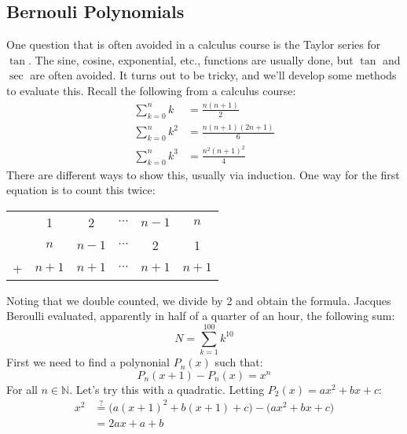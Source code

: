         \subsection{Bernouli Polynomials}
            One question that is often avoided in a calculus course
            is the Taylor series for $\tan$. The sine, cosine,
            exponential, etc., functions are usually done, but
            $\tan$ and $\sec$ are often avoided. It turns out to be
            tricky, and we'll develop some methods to evaluate this.
            Recall the following from a calculus course:
            \begin{align}
                \sum_{k=0}^{n}k&=\frac{n(n+1)}{2}\\
                \sum_{k=0}^{n}k^{2}&=
                \frac{n(n+1)(2n+1)}{6}\\
                \sum_{k=0}^{n}k^{3}&=\frac{n^{2}(n+1)^{2}}{4}
            \end{align}
            There are different ways to show this, usually via
            induction. One way for the first equation is to count
            this twice:
            \begin{table}[]
                \centering
                \begin{tabular}{cc|c|c|c|c}
                    &1&2&$\cdots$&$n-1$&$n$\\
                    &$n$&$n-1$&$\cdots$&2&1\\
                    \hline
                    +&$n+1$&$n+1$&$\cdots$&$n+1$&$n+1$
                \end{tabular}
            \end{table}
            Noting that we double counted, we divide by 2 and
            obtain the formula.
            Jacques Beroulli evaluated, apparently in half of a
            quarter of an hour, the following sum:
            \begin{equation}
                N=\sum_{k=1}^{100}k^{10}
            \end{equation}
            First we need to find a polynonial $P_{n}(x)$ such that:
            \begin{equation}
                P_{n}(x+1)-P_{n}(x)=x^{n}
            \end{equation}
            For all $n\in\mathbb{N}$. Let's try this with a
            quadratic. Letting $P_{2}(x)=ax^{2}+bx+c$:
            \begin{align}
                x^{2}&\overset{\textrm{?}}{=}
                \big(a(x+1)^{2}+b(x+1)+c\big)-
                \big(ax^{2}+bx+c\big)\\
                &=2ax+a+b
            \end{align}

